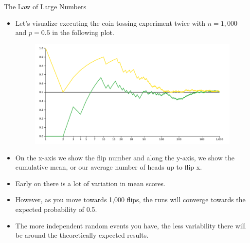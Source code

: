 \documentclass[handout]{beamer}
\begin{document}
\begin{frame}{The Law of Large Numbers}

\scriptsize{
\begin{itemize}
\item  Let's visualize executing the coin tossing experiment twice with $n=1,000$ and $p=0.5$ in the following plot.

\begin{figure}[h!]
	\centering
	\includegraphics[scale=0.2]{pics/large_numbers.png}
\end{figure} 

\item On the x-axis we show the flip number and along the y-axis, we show the cumulative mean, or our average number of heads up to flip x. 

\item  Early on there is a lot of variation in mean scores. 
\item However, as you move towards 1,000 flips, the runs will converge towards the expected probability of 0.5. 
\item The more independent random events you have, the less variability there will be around the theoretically expected results.
 \end{itemize}

}
\end{frame}
\end{document}
